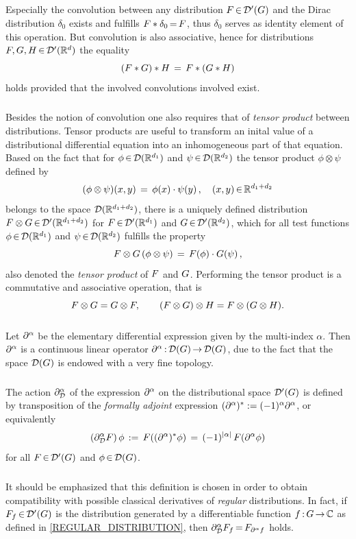 \documentclass[11pt,twoside]{article}
\def\G{G}
\begin{document}
\subparagraph{}
Especially the convolution between any distribution $\disF \xeof \D'(\G)$
and the Dirac distribution $\delta_0$ exists and
fulfills $F \ast \delta_0 {\,=\,} F$,
thus $\delta_0$ serves as identity element of this operation.
But convolution is also associative,
hence for distributions $F, G, H {\,\in\,} {\mathcal{D}}'({\mathbb{R}}^d)$ the equality
\[
(F \ast G) \ast H \,=\, F \ast (G \ast H)
\]
holds provided that
the involved convolutions involved exist.

\subparagraph{}
Besides the notion of convolution one also requires
that of \textit{tensor product} between distributions.
Tensor products are useful to transform an inital value
of a distributional differential equation
into an inhomogeneous part of that equation.
Based on the fact
that for $\phi {\,\in\,} {\mathcal{D}}({\mathbb{R}}^{d_1})$ and $\psi {\,\in\,} {\mathcal{D}}({\mathbb{R}}^{d_2})$ 
the tensor product $\phi \otimes \psi$ defined by
\[
(\phi \otimes \psi)(x,y) \,=\, \phi(x) \cdot \psi(y)\,,
\quad (x,y) {\,\in\,} {\mathbb{R}}^{d_1+d_2}
\]
belongs to the space ${\mathcal{D}}({\mathbb{R}}^{d_1+d_2})$,
there is
a uniquely defined distribution
$
F \otimes G {\,\in\,} {\mathcal{D}}'({\mathbb{R}}^{d_1+d_2})
$
for $F {\,\in\,} {\mathcal{D}}'({\mathbb{R}}^{d_1})$ and $G {\,\in\,} {\mathcal{D}}'({\mathbb{R}}^{d_2})$,
which for all test functions
$\phi {\,\in\,} {\mathcal{D}}({\mathbb{R}}^{d_1})$ and $\psi {\,\in\,} {\mathcal{D}}({\mathbb{R}}^{d_2})$
fulfills the property
\[
F \otimes G \, (\phi \otimes \psi)
\,=\, F(\phi) \cdot G(\psi)\,,
\]
also denoted the \textit{tensor product} of $F$ and $G$.
Performing the tensor product is a commutative and associative operation,
that is
\[
F \otimes G = G \otimes F,
\quad \quad
(F \otimes G) \otimes H =
 F \otimes (G \otimes H).
\]

\subparagraph{}
Let $\partial^{\alpha}$ be the elementary differential expression
given by the multi-index $\alpha$.
Then $\partial^{\alpha}$ is a continuous linear operator $\PA \:\D(\G) \xto \D(\G)$,
due to the fact
that the space $\D(\G)$ is endowed with a very fine topology.

\subparagraph{}
The action $\partial^{\alpha}_{{\mathcal{D}}}$ of the expression $\partial^{\alpha}$
on the distributional space $\D'(\G)$
is defined by transposition of the \textit{formally adjoint} expression
$(\partial^{\alpha})^* := (-1)^{\alpha} \partial^{\alpha}$,
or equivalently
\begin{equation}\label{DISTRIBUTIONAL_DERIVATIVE}
(\PA_{\D} \disF) \, \phi \, := \, \disF((\PA)^* \phi)
\= (-1)^{\abs{\alpha} } \, \disF(\PA \phi)
\end{equation}
for all $\disF \xeof \D'(\G)$ and $\phi \xeof \D(\G)$.

\subparagraph{}
It should be emphasized
that this definition is chosen in order
to obtain compatibility with possible classical derivatives
of \textit{regular} distributions.
In fact,
if $F_f \xeof \D'(\G)$ is the distribution generated
by a differentiable function $f \:\G \xto \C$
as defined in \eqref{REGULAR_DISTRIBUTION},
then $\partial^{\alpha}_{{\mathcal{D}}} F_f {\,=\,} F_{\partial^{\alpha} f}$ holds.
\end{document}
